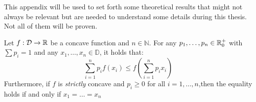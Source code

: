 This appendix will be used to set forth some theoretical results that might not always be relevant but are needed to understand some details during this thesis. Not all of them will be proven.

\begin{nprop}\label{prop:jensen}
    Let $f:\mathcal D \to \mathbb{R}$ be a concave function and $n\in \mathbb N$. For any $p_1,\dots,p_n \in \mathbb{R}^+_0$ with $\sum p_i = 1$ and any $x_1,\dots,x_n \in \mathbb D$, it holds that:
    $$
    \sum_{i = 1}^n p_i f(x_i) \leq f(\sum_{i=1}^n p_i x_i)
    $$
    Furthermore, if $f$ is \emph{strictly} concave and $p_i \geq 0$ for all $i  = 1,\dots,n$,then the equality holds if and only if $x_1 = \dots = x_n$
\end{nprop}
